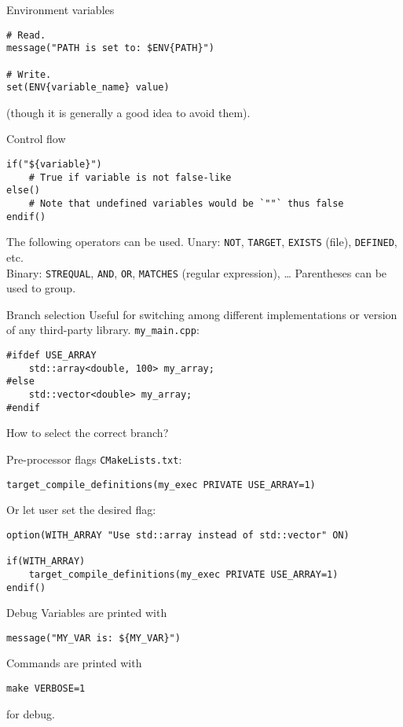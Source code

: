 \documentclass[aspectratio=169,11pt]{beamer}
\begin{document}
\begin{frame}[fragile]{Environment variables}
\begin{verbatim}
# Read.
message("PATH is set to: $ENV{PATH}")

# Write.
set(ENV{variable_name} value)
\end{verbatim}

(though it is generally a good idea to avoid them).
\end{frame}

\begin{frame}[fragile]{Control flow}
\begin{verbatim}
if("${variable}")
    # True if variable is not false-like
else()
    # Note that undefined variables would be `""` thus false
endif()
\end{verbatim}
\vfill
The following operators can be used.
\vfill
Unary: \texttt{NOT}, \texttt{TARGET}, \texttt{EXISTS} (file), \texttt{DEFINED}, etc.\\
Binary: \texttt{STREQUAL}, \texttt{AND}, \texttt{OR}, \texttt{MATCHES} (regular expression), \dots
\vfill
Parentheses can be used to group.
\end{frame}

\begin{frame}[fragile]{Branch selection}
Useful for switching among different implementations or version of any third-party library.
\vfill
\texttt{my\_main.cpp}:
\begin{verbatim}
#ifdef USE_ARRAY
    std::array<double, 100> my_array;
#else
    std::vector<double> my_array;
#endif
\end{verbatim}

How to select the correct branch?
\end{frame}

\begin{frame}[fragile]{Pre-processor flags}
\texttt{CMakeLists.txt}:
\begin{verbatim}
target_compile_definitions(my_exec PRIVATE USE_ARRAY=1)
\end{verbatim}
Or let user set the desired flag:
\begin{verbatim}
option(WITH_ARRAY "Use std::array instead of std::vector" ON)

if(WITH_ARRAY)
    target_compile_definitions(my_exec PRIVATE USE_ARRAY=1)
endif()
\end{verbatim}
\end{frame}

\begin{frame}[fragile]{Debug}
Variables are printed with
\begin{verbatim}
message("MY_VAR is: ${MY_VAR}")
\end{verbatim}
\vfill
Commands are printed with
\begin{verbatim}
make VERBOSE=1
\end{verbatim}
for debug.
\end{frame}
\end{document}
